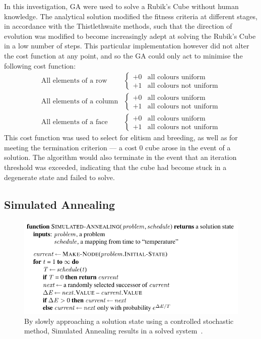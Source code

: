 \documentclass[UKenglish]{svproc}
\begin{document}
In this investigation, GA were used to solve a Rubik's Cube without human knowledge. The analytical solution modified the fitness criteria at different stages, in accordance with the Thistlethwaite methods, such that the direction of evolution was modified to become increasingly adept at solving the Rubik's Cube in a low number of steps.  This particular implementation however did not alter the cost function at any point, and so the GA could only act to minimise the following cost function:
\begin{align*}
  \text{All elements of a row} &
  \begin{cases}
    +0 & \text{all colours uniform} \\
    +1 & \text{all colours not uniform}
  \end{cases} \\
  \text{All elements of a column} &
  \begin{cases}
    +0 & \text{all colours uniform} \\
    +1 & \text{all colours not uniform}
  \end{cases} \\
  \text{All elements of a face} &
  \begin{cases}
    +0 & \text{all colours uniform} \\
    +1 & \text{all colours not uniform}
  \end{cases}
\end{align*}
This cost function was used to select for elitism and breeding, as well as for meeting the termination criterion --- a cost 0 cube arose in the event of a solution. The algorithm would also terminate in the event that an iteration threshold was exceeded, indicating that the cube had become stuck in a degenerate state and failed to solve.

\subsection{Simulated Annealing}

\begin{figure}[!ht]
  \centering
  \includegraphics[width=0.9\linewidth]{simulated-annealing}
  \caption{By slowly approaching a solution state using a controlled stochastic
    method, Simulated Annealing results in a solved system~\cite{10.5555/1671238}.}
  \label{fig:simulated-annealing}
\end{figure}
\end{document}
